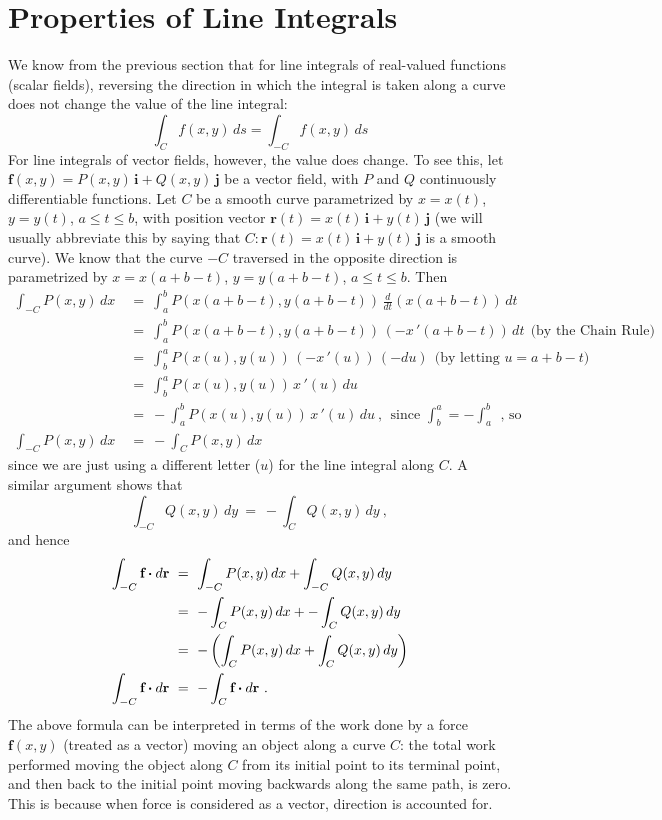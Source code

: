 \section{Properties of Line Integrals}
We know from the previous section that for line integrals of real-valued functions (scalar fields), reversing the
direction in which the integral is taken along a curve does not change the value of the line integral:
\begin{equation}
 \int_C f(x,y)\,ds = \int_{-C} f(x,y)\,ds
\end{equation}
For line integrals of vector fields, however, the value does change. To see this, let $\textbf{f}(x,y) =
P(x,y)\,\textbf{i} + Q(x,y)\,\textbf{j}$ be a vector field, with $P$ and $Q$ continuously differentiable
functions. Let $C$ be a smooth curve parametrized by $x=x(t)$, $y=y(t)$, $a \le t \le b$, with position vector
$\textbf{r}(t) = x(t)\,\textbf{i} + y(t)\,\textbf{j}$ (we will usually abbreviate this by saying that
$C: \textbf{r}(t) = x(t)\,\textbf{i} + y(t)\,\textbf{j}$ is a smooth curve). We know that the curve $-C$ traversed in
the opposite direction is parametrized by $x=x(a+b-t)$, $y=y(a+b-t)$, $a \le t \le b$. Then
\begin{align*}
 \int_{-C} P(x,y)\,dx ~&=~ \int_a^b P(x(a+b-t),y(a+b-t))\,\frac{d}{dt}(x(a+b-t))\,dt\\
  &=~ \int_a^b P(x(a+b-t),y(a+b-t))\,(-x\,'(a+b-t))\,dt~~\text{(by the Chain Rule)}\\
  &=~ \int_b^a P(x(u),y(u))\,(-x\,'(u))\,(-du)~~\text{(by letting $u=a+b-t$)}\\
  &=~ \int_b^a P(x(u),y(u))\,x\,'(u)\,du\\
  &=~ -\int_a^b P(x(u),y(u))\,x\,'(u)\,du~,~~\text{since $\int_b^a = -\int_a^b ~~$, so}\\
  \int_{-C} P(x,y)\,dx ~&=~ -\int_C P(x,y)\,dx
\end{align*}
since we are just using a different letter ($u$) for the line integral along $C$. A similar argument shows that
\begin{displaymath}
 \int_{-C} Q(x,y)\,dy ~=~ -\int_C Q(x,y)\,dy ~,
\end{displaymath}
and hence
\begin{align}
 \int_{-C} \textbf{f} \bm{\cdot} d\textbf{r} ~&=~ \int_{-C} P(x,y)\,dx + \int_{-C} Q(x,y)\,dy\notag\\
  &=~ -\int_C P(x,y)\,dx + -\int_C Q(x,y)\,dy\notag\\
  &=~ -\left( \int_C P(x,y)\,dx + \int_C Q(x,y)\,dy \right)\notag\\
  \int_{-C} \textbf{f} \bm{\cdot} d\textbf{r} ~&=~ -\int_C \textbf{f} \bm{\cdot} d\textbf{r} ~.
\end{align}
\newpage
The above formula can be interpreted in terms of the work done by a force $\textbf{f}(x,y)$ (treated as a vector) moving
an object along a curve $C$: the total work performed moving the object along $C$ from its initial point to its terminal
point, and then back to the initial point moving backwards along the same path, is zero. This is because when force is
considered as a vector, direction is accounted for.

